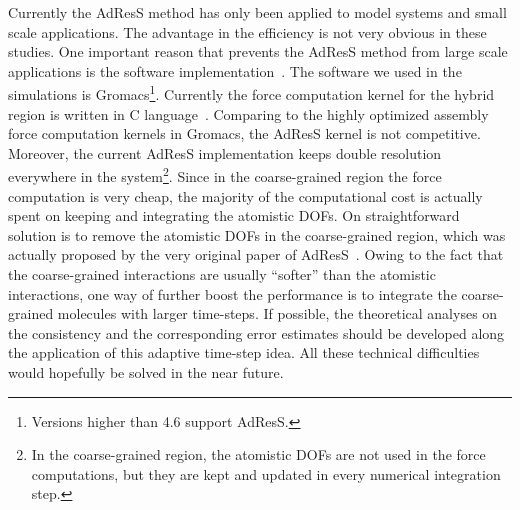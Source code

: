 \documentclass[epjST]{svjour}
\begin{document}

Currently the AdResS method has only been applied to model systems and small scale
applications. The advantage in the efficiency is not very obvious in these studies.
One important reason that prevents the AdResS method from
large scale applications is the software implementation~\cite{agarwal2014chemical}.
The software we used in the simulations is Gromacs\footnote{Versions higher than 4.6 support
AdResS.}.
Currently the force computation kernel for the hybrid region is written in C language~\cite{kernighan1988c}.
Comparing to the highly optimized assembly force computation kernels in Gromacs,
the AdResS kernel is not competitive. Moreover, the current AdResS implementation
keeps double resolution everywhere in the system\footnote{In the coarse-grained region,
  the atomistic DOFs are not used in the force computations, but they are kept and updated
  in every numerical integration step.
}.
Since in the coarse-grained region the force computation is very cheap, the majority
of the computational cost is actually spent on keeping and integrating the atomistic DOFs.
On straightforward solution is to remove the atomistic DOFs in the coarse-grained
region, which was actually proposed by the very original paper of AdResS~\cite{praprotnik2005adaptive}.
Owing to the fact that the coarse-grained interactions are usually ``softer''
than the atomistic interactions, one way of further boost the performance is
to integrate the coarse-grained molecules with larger time-steps.
If possible, the theoretical analyses on the
consistency and the corresponding
error estimates should be developed along the application of this adaptive time-step idea.
All these technical difficulties would hopefully be solved in the near future.




{}


\end{document}

